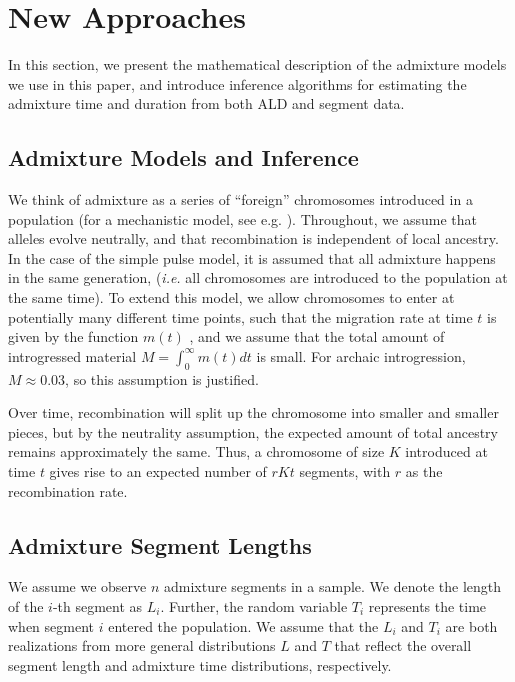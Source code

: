 \documentclass[11pt]{article}
\begin{document}
\section{New Approaches}\label{new approaches}

In this section, we present the mathematical description of the admixture models we use in this paper, and introduce inference algorithms for estimating the admixture time and duration from both ALD and segment data. 


\subsection{Admixture Models and Inference}\label{admixture models}
	
We think of admixture as a series of ``foreign'' chromosomes introduced in a population (for a mechanistic model, see e.g. \cite{pool_inference_2009}). Throughout, we assume that alleles evolve neutrally, and that recombination is independent of local ancestry. In the case of the simple pulse model, it is assumed that all admixture happens in the same generation, (\textit{i.e.} all chromosomes are introduced to the population at the same time). To extend this model, we allow chromosomes to enter at potentially many different time points, such that the migration rate at time $t$ is given by the function $m(t)$ \citep{pool_inference_2009}, and we assume that the total amount of introgressed material $M=\int_0^\infty m(t)dt$ is small. For archaic introgression, $M \approx 0.03$, so this assumption is justified.

Over time, recombination will split up the chromosome into smaller and smaller pieces, but by the neutrality assumption, the expected amount of total ancestry remains approximately the same. Thus, a chromosome of size $K$ introduced at time $t$ gives rise to an expected number of $rKt$ segments, with $r$ as the recombination rate.


\subsection{Admixture Segment Lengths}
We assume we observe $n$ admixture segments in a sample. We denote the length of the $i$-th segment as $L_i$. Further, the random variable $T_i$ represents the time when segment $i$ entered the population. We assume that the $L_i$ and $T_i$ are both realizations from more general distributions $L$ and $T$ that reflect the overall segment length and admixture time distributions, respectively. 
\end{document}
